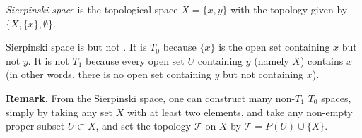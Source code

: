 \documentclass{article}
\begin{document}
\emph{Sierpinski space} is the topological space $X=\lbrace x,y\rbrace$ with the topology given by $\lbrace X, \{ x\} ,\emptyset \rbrace$.

Sierpinski space is  but not .  It is $T_0$ because $\lbrace x\rbrace$ is the open set containing $x$ but not $y$.  It is not $T_1$ because every open set $U$ containing $y$ (namely $X$) contains $x$ (in other words, there is no open set containing $y$ but not containing $x$).

\textbf{Remark}.  From the Sierpinski space, one can construct many non-$T_1$ $T_0$ spaces, simply by taking any set $X$ with at least two elements, and take any non-empty proper subset $U\subset X$, and set the topology $\mathcal{T}$ on $X$ by $\mathcal{T}=P(U)\cup \lbrace X\rbrace$.
\end{document}
